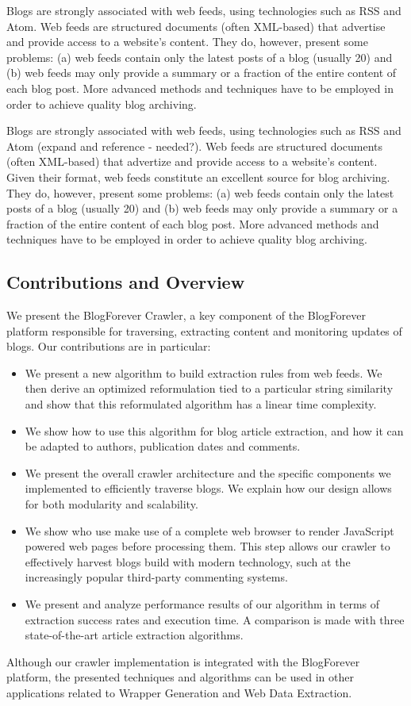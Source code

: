 Blogs are strongly associated with web feeds, using technologies such as RSS and Atom. Web feeds are structured documents (often XML-based) that advertise and provide access to a website's content. 
They do, however, present some problems:
(a) web feeds contain only the latest posts of a blog (usually 20) and
(b) web feeds may only provide a summary or a fraction of the entire content of each blog post. More advanced methods and techniques have to be employed in order to achieve quality blog archiving.


Blogs are strongly associated with web feeds, using technologies such as RSS and Atom (expand and reference - needed?). Web feeds are structured documents (often XML-based) that advertize and provide access to a website's content. Given their format, web feeds constitute an excellent source for blog archiving. They do, however, present some problems: (a) web feeds contain only the latest posts of a blog (usually 20) and (b) web feeds may only provide a summary or a fraction of the entire content of each blog post. More advanced methods and techniques have to be employed in order to achieve quality blog archiving.


\subsection{Contributions and Overview}
We present the BlogForever Crawler, a key component of the BlogForever platform responsible for traversing, extracting content and monitoring updates of blogs. Our contributions are in particular:

\begin{itemize}
  \item We present a new algorithm to build extraction rules from web feeds. We then derive an optimized reformulation tied to a particular string similarity and show that this reformulated algorithm has a linear time complexity.
  \item We show how to use this algorithm for blog article extraction, and how it can be adapted to authors, publication dates and comments.
  \item We present the overall crawler architecture and the specific components we implemented to efficiently traverse blogs. We explain how our design allows for both modularity and scalability.
  \item We show who use make use of a complete web browser to render JavaScript powered web pages before processing them. This step allows our crawler to effectively harvest blogs build with modern technology, such at the increasingly popular third-party commenting systems.
  \item We present and analyze performance results of our algorithm in terms of extraction success rates and execution time. A comparison is made with three state-of-the-art article extraction algorithms.
\end{itemize}

Although our crawler implementation is integrated with the BlogForever platform, the presented techniques and algorithms can be used in other applications related to Wrapper Generation and Web Data Extraction.
